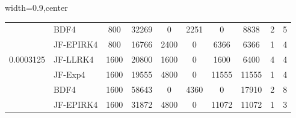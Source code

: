 \begin{table}
\begin{adjustbox}{width=0.9\columnwidth,center}
\begin{tabular}{cccccccccc}
			\multicolumn{1}{l}{} & \multicolumn{1}{l}{BDF4} & 800 & 32269 & 0 & 2251 & 0
			& 8838 & 2 & 5 \\
			\multicolumn{1}{l}{} & \multicolumn{1}{l}{JF-EPIRK4} & 800 & 16766 & 2400 & 0 &
			6366 & 6366 & 1 & 4 \\
			\multicolumn{1}{l}{0.0003125} & \multicolumn{1}{l}{JF-LLRK4} & 1600 & 20800
			& 1600 & 0 & 1600 & 6400 & 4 & 4 \\
			\multicolumn{1}{l}{} & \multicolumn{1}{l}{JF-Exp4} & 1600 & 19555 & 4800 & 0
			& 11555 & 11555 & 1 & 4 \\
			\multicolumn{1}{l}{} & \multicolumn{1}{l}{BDF4} & 1600 & 58643 & 0 & 4360 & 0
			& 17910 & 2 & 8 \\
			\multicolumn{1}{l}{} & \multicolumn{1}{l}{JF-EPIRK4} & 1600 & 31872 & 4800 & 0 &
			11072 & 11072 & 1 & 3 \\
			\hline
		\end{tabular}
	\end{adjustbox}
	\label{tab:bg}
\end{table}

